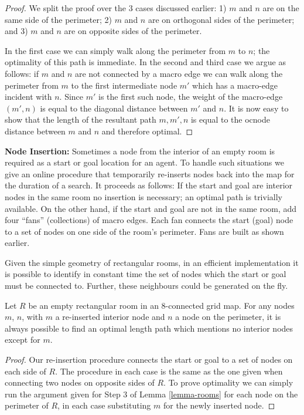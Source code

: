 \begin{proof}
We split the proof over the 3 cases discussed earlier:
1) {$m$ and $n$ are on the same side of the perimeter;}
2) {\label{lemma-rooms-step2}$m$ and $n$ are on orthogonal sides of the perimeter;} and
3) {\label{lemma-rooms-step3} $m$ and $n$ are on opposite sides of the perimeter.}

In the first case we can simply walk along the perimeter from $m$ to $n$; the optimality of this path is immediate. 
In the second and third case we argue as follows: if $m$ and $n$ are not connected by a macro edge
we can walk along the perimeter from $m$ to the first intermediate node $m'$
which has a macro-edge incident with $n$. 
Since $m'$ is the first such node, the weight of the macro-edge $(m', n)$ is equal to
the diagonal distance between $m'$ and $n$. 
It is now easy to show that the length of the resultant path ${m, m', n}$ is equal to the ocnode distance between 
$m$ and $n$ and therefore optimal.
\end{proof}

\noindent
\textbf{Node Insertion:}
Sometimes a node from the interior of an empty room is required as a start or
goal location for an agent.  To handle such situations we give an online
procedure that temporarily re-inserts nodes back into the map for the duration
of a search.  
It proceeds as follows: {If the start and goal are interior nodes in the same
room no insertion is necessary; an optimal path is trivially available. } {On
the other hand, if the start and goal are not in the same room, add four
``fans'' (collections) of macro edges.  Each fan connects the start (goal) node
to a set of nodes on one side of the room's perimeter.  Fans are built as shown
earlier.}

Given the simple geometry of rectangular rooms,
in an efficient implementation it is possible to identify in constant time the set of nodes which 
the start or goal must be connected to.
Further, these neighbours could be generated on the fly.

\begin{lemma}
\label{lemma-insertion}
Let $R$ be an empty rectangular room in an 8-connected grid map.
For any nodes $m$, $n$, with $m$ a re-inserted interior node and $n$ a node on the perimeter, it is always possible to
find an optimal length path which mentions no interior nodes except for $m$.
\end{lemma}
\begin{proof}
Our re-insertion procedure connects the start or goal to a set of nodes on each side of $R$.
The procedure in each case is the same as the one given when connecting two nodes on opposite sides of $R$.
To prove optimality we can simply run the argument given for Step 3 of Lemma \ref{lemma-rooms} for each
node on the perimeter of $R$, in each case substituting $m$ for the newly inserted node.
\end{proof}

